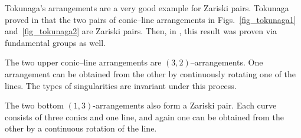 \documentclass{svproc}
\begin{document}
\begin{example}
    Tokunaga's arrangements are a very good example for Zariski pairs. Tokunaga proved in \cite{tokunaga2014} that the two pairs of conic--line arrangements in Figs.~\ref{fig_tokunaga1} and~\ref{fig_tokunaga2} are Zariski pairs. Then, in \cite{arxiv_version}, this result was proven via fundamental groups as well.
    
    The two upper conic--line arrangements are $(3,2)$--arrangements. One arrangement can be obtained from the other by continuously rotating one of the lines. The types of singularities are invariant under this process. 

    The two bottom $(1,3)$-arrangements also form a Zariski pair. Each curve consists of three conics and one line, and again one can be obtained from the other by a continuous rotation of the line.






\begin{figure}[ht]
\centering
{}
\end{figure}
\end{example}
\end{document}
